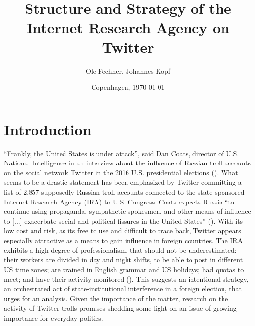 \documentclass[12pt, titlepage=true, toc=bib]{scrartcl}
\begin{document}
\titlehead{}
\author{Ole Fechner, Johannes Kopf}
\title{Structure and Strategy of the Internet Research Agency on Twitter}


\date{\normalsize{Copenhagen, \today}}

\publishers{}

\maketitle[0]

\newpage

\thispagestyle{empty}
\tableofcontents

\newpage

\thispagestyle{empty}
\listoftables

\newpage

\thispagestyle{empty}
\listoffigures

\newpage
\setcounter{page}{1}

\section{Introduction}

``Frankly, the United States is under attack'', said Dan Coats, director of U.S. National Intelligence in an interview about the influence of Russian troll accounts on the social network Twitter in the 2016 U.S. presidential elections (\cite{popken_twitter_2018}). What seems to be a drastic statement has been emphasized by Twitter committing a list of 2,857 supposedly Russian troll accounts connected to the state-sponsored Internet Research Agency (IRA) to U.S. Congress. Coats expects Russia ``to continue using propaganda, sympathetic spokesmen, and other means of influence to [...] exacerbate social and political fissures in the United States'' (\cite{popken_twitter_2018}). With its low cost and risk, as its free to use and difficult to trace back, Twitter appears especially attractive as a means to gain influence in foreign countries. The IRA exhibits a high degree of professionalism, that should not be underestimated: their workers are divided in day and night shifts, to be able to post in different US time zones; are trained in English grammar and US holidays; had quotas to meet; and have their activity monitored (\cite{kirby_what_2018}). This suggests an intentional strategy, an orchestrated act of state-institutional interference in a foreign election, that urges for an analysis. Given the importance of the matter, research on the activity of Twitter trolls promises shedding some light on an issue of growing importance for everyday politics.
\end{document}
